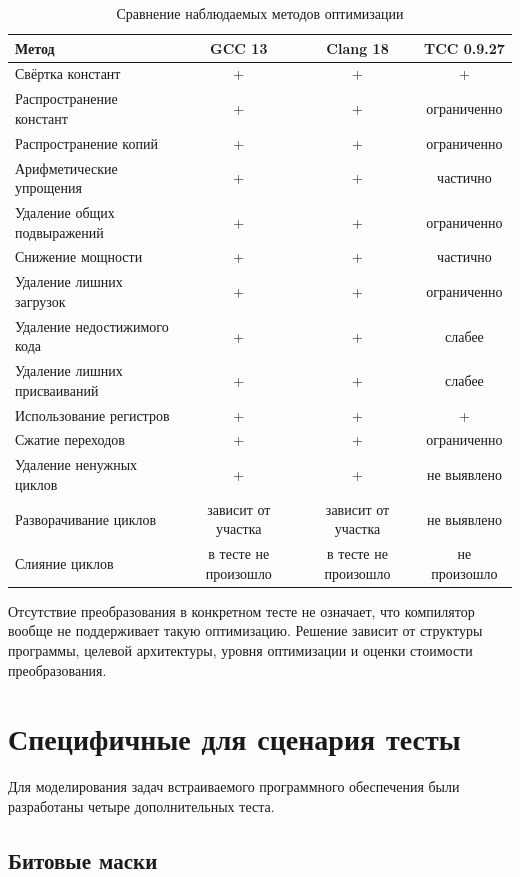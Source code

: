 \documentclass[12pt,a4paper]{article}
\begin{document}
\begin{table}[H]
\centering
\caption{Сравнение наблюдаемых методов оптимизации}
\small
\begin{tabular}{lccc}
\toprule
Метод & GCC 13 & Clang 18 & TCC 0.9.27 \\
\midrule
Свёртка констант & + & + & + \\
Распространение констант & + & + & ограниченно \\
Распространение копий & + & + & ограниченно \\
Арифметические упрощения & + & + & частично \\
Удаление общих подвыражений & + & + & ограниченно \\
Снижение мощности & + & + & частично \\
Удаление лишних загрузок & + & + & ограниченно \\
Удаление недостижимого кода & + & + & слабее \\
Удаление лишних присваиваний & + & + & слабее \\
Использование регистров & + & + & + \\
Сжатие переходов & + & + & ограниченно \\
Удаление ненужных циклов & + & + & не выявлено \\
Разворачивание циклов & зависит от участка & зависит от участка & не выявлено \\
Слияние циклов & в тесте не произошло & в тесте не произошло & не произошло \\
\bottomrule
\end{tabular}
\end{table}

Отсутствие преобразования в конкретном тесте не означает, что компилятор вообще не поддерживает такую оптимизацию. Решение зависит от структуры программы, целевой архитектуры, уровня оптимизации и оценки стоимости преобразования.

\section{Специфичные для сценария тесты}

Для моделирования задач встраиваемого программного обеспечения были разработаны четыре дополнительных теста.

\subsection{Битовые маски}
\end{document}
